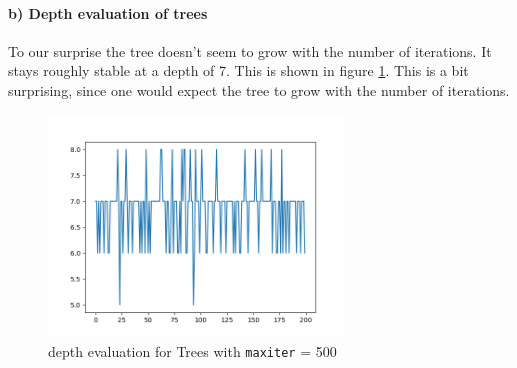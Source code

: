 \documentclass{article}
\begin{document}

\paragraph*{b) Depth evaluation of trees}

To our surprise the tree doesn't seem to grow with the number of iterations. It stays roughly stable at a depth of 7. This is shown in figure \ref{fig:tree}. This is a bit surprising, since one would expect the tree to grow with the number of iterations. 
\begin{figure}[H]
\centering
\includegraphics[width=0.7\textwidth]{images/depth_evolution.png}
\caption{depth evaluation for Trees with \texttt{maxiter} = 500}
\label{fig:tree}
\end{figure}
\end{document}
